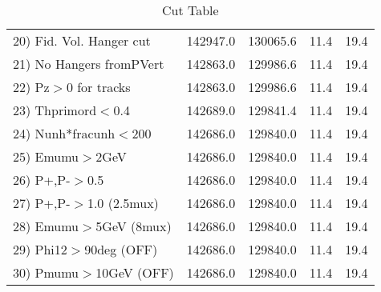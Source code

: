 \begin{table}[h!]
\begin{tabular}{||l||r|r|r|r||}
 20) Fid. Vol. Hanger cut &    142947.0 &    130065.6 &        11.4 &        19.4 \\
 21) No Hangers fromPVert &    142863.0 &    129986.6 &        11.4 &        19.4 \\
 22) Pz$>$0 for tracks    &    142863.0 &    129986.6 &        11.4 &        19.4 \\
 23) Thprimord$<$0.4      &    142689.0 &    129841.4 &        11.4 &        19.4 \\
 24) Nunh*fracunh$<$200   &    142686.0 &    129840.0 &        11.4 &        19.4 \\
 25) Emumu$>$2GeV         &    142686.0 &    129840.0 &        11.4 &        19.4 \\
 26) P+,P-$>$0.5          &    142686.0 &    129840.0 &        11.4 &        19.4 \\
 27) P+,P-$>$1.0 (2.5mux) &    142686.0 &    129840.0 &        11.4 &        19.4 \\
 28) Emumu$>$5GeV  (8mux) &    142686.0 &    129840.0 &        11.4 &        19.4 \\
 29) Phi12$>$90deg  (OFF) &    142686.0 &    129840.0 &        11.4 &        19.4 \\
 30) Pmumu$>$10GeV  (OFF) &    142686.0 &    129840.0 &        11.4 &        19.4 \\
 \hline
 \hline
 \end{tabular}
 \caption{Cut Table \cohjp  }
 \label{tab-cut__jpsi}
 \end{table}
